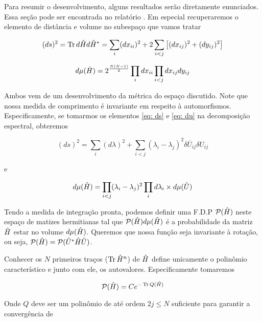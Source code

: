 Para resumir o desenvolvimento, alguns resultados serão diretamente enunciados. Essa seção pode ser encontrada no relatório \cite{fyodorov2010introduction}. Em especial recuperaremos o elemento de distância e volume no subespaço que vamos tratar

\begin{equation}
	(ds)^2 = \operatorname{Tr}{d\hat H d\hat H^*} = \sum_{i} (dx_{ii})^2 + 2 \sum_{i < j} \left[(dx_{ij})^2 + (dy_{ij})^2 \right]
	\label{eq: ds}
\end{equation}

\begin{equation}
	d\mu(\hat H) = 2^{\frac{N(N-1)}{2}} \prod_{i} dx_{ii} \prod_{i<j} dx_{ij} dy_{ij}
	\label{eq: du}
\end{equation}

Ambos vem de um desenvolvimento da métrica do espaço discutido. Note que nossa medida de comprimento é invariante em respeito à automorfismos. Especificamente, se tomarmos os elementos \eqref{eq: ds} e \eqref{eq: du} na decomposição espectral, obteremos

\begin{equation}
	(ds)^2 = \sum_{i} (d\lambda)^2 + \sum_{i<j} (\lambda_i - \lambda_j)^2 \overline{\delta U_{ij}} \delta U_{ij}
\end{equation}

e

\begin{equation}
	d\mu(\hat H) = \prod_{i < j} (\lambda_i - \lambda_j)^2 \prod_{i} d\lambda_i \times d\mu(\hat U)
\end{equation}

Tendo a medida de integração pronta, podemos definir uma F.D.P $\mathcal{P}(\hat H)$ neste espaço de matizes hermitianas tal que $\mathcal{P}(\hat H) d\mu(\hat H)$ é a probabilidade da matriz $\hat H$  estar no volume $d\mu(\hat H)$. Queremos que nossa função seja invariante à rotação, ou seja, $\mathcal{P}(\hat H) = \mathcal{P}( \hat U^* \hat H \hat U)$.

Conhecer os $N$ primeiros traços ($\operatorname{Tr}{\hat H^n}$) de $\hat H$ define unicamente o polinômio característico e junto com ele, os autovalores. Especificamente tomaremos 

\begin{equation}
	\mathcal{P}(\hat H) = Ce^{-\operatorname{Tr}{Q(\hat H)}}
	\label{eq: p}
\end{equation}

Onde $Q$ deve ser um polinômio de até ordem $2j \leq N$ suficiente para garantir a convergência de

